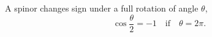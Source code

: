 \documentclass{article}
\begin{document}
A spinor changes sign under a full rotation of angle $\theta$,
\begin{equation}
\cos\frac{\theta}{2} = -1 \quad \text{if} \quad \theta = 2\pi .
\label{eq:full}
\end{equation}
\end{document}
